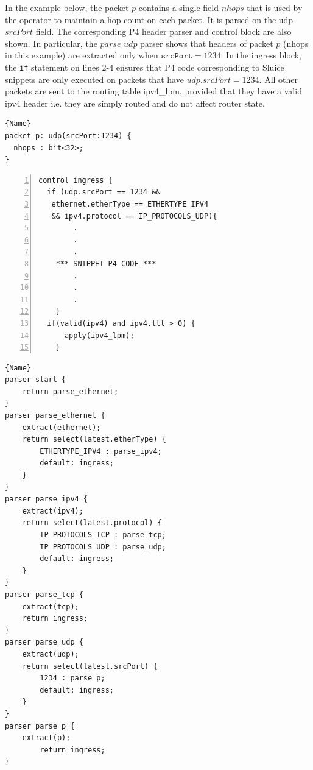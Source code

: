 \documentclass[12pt, oneside]{article}
\begin{document}
In the example below, the packet $p$ contains a single field $nhops$ that is used by the operator to maintain a hop count on each packet. It is parsed on the udp $srcPort$ field.  The corresponding P4 header parser and control block are also shown. In particular, the $parse\_udp$ parser shows that headers of packet $p$ (nhops in this example) are extracted only when $\texttt{srcPort}=1234$. In the ingress block, the \texttt{if} statement on lines 2-4 ensures that P4 code corresponding to Sluice snippets are only executed on packets that have $udp.srcPort = 1234$. All other packets are sent to the routing table ipv4\_lpm, provided that they have a valid ipv4 header i.e. they are simply routed and do not affect router state.

\noindent\begin{minipage}{.45\textwidth}
\begin{lstlisting}[basicstyle=\linespread{1.3}\scriptsize, caption={Sluice Parser Condition},frame=tlrb]{Name}
packet p: udp(srcPort:1234) {
  nhops : bit<32>;
}
\end{lstlisting}
\begin{lstlisting}[numbers=left, firstnumber=1, caption={P4 Ingress Control Block}, basicstyle=\linespread{1.3}\scriptsize, frame=tlrb]
control ingress {
  if (udp.srcPort == 1234 && 
   ethernet.etherType == ETHERTYPE_IPV4 
   && ipv4.protocol == IP_PROTOCOLS_UDP){
		.
		.
		.
	*** SNIPPET P4 CODE ***
		.
		.
		.
	}
  if(valid(ipv4) and ipv4.ttl > 0) {
      apply(ipv4_lpm);
    }
\end{lstlisting}

\end{minipage}\hfill
\begin{minipage}{.45\textwidth}
\begin{lstlisting}[caption={P4 Parser},frame=tlrb, basicstyle=\linespread{1.08}\scriptsize]{Name}
parser start {
    return parse_ethernet;
}
parser parse_ethernet {
    extract(ethernet);
    return select(latest.etherType) {
        ETHERTYPE_IPV4 : parse_ipv4;
        default: ingress;
    }
}
parser parse_ipv4 {
    extract(ipv4);
    return select(latest.protocol) {
        IP_PROTOCOLS_TCP : parse_tcp;
        IP_PROTOCOLS_UDP : parse_udp;
        default: ingress;
    }
}
parser parse_tcp {
    extract(tcp);
    return ingress;
}
parser parse_udp {
    extract(udp);
    return select(latest.srcPort) {
        1234 : parse_p;
        default: ingress;
    }
}
parser parse_p {
    extract(p);
        return ingress;
}
\end{lstlisting}
\end{minipage}
\end{document}
